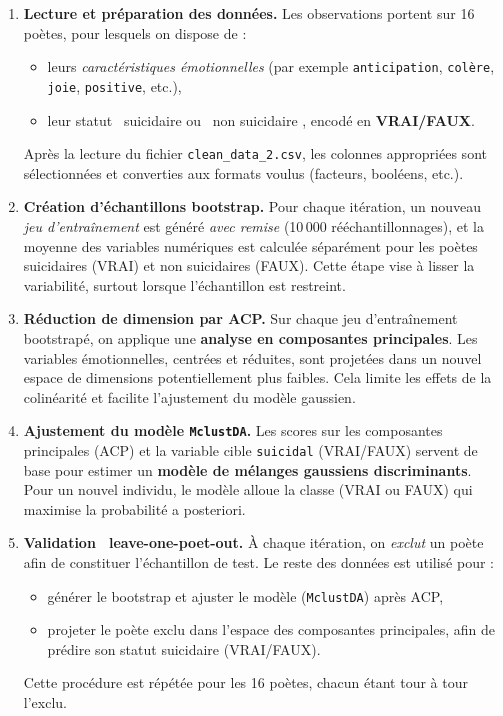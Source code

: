 \begin{enumerate}
	\item \textbf{Lecture et préparation des données.}  
	Les observations portent sur 16 poètes, pour lesquels on dispose de :
	\begin{itemize}
		\item leurs \emph{caractéristiques émotionnelles} (par exemple \texttt{anticipation}, \texttt{colère}, \texttt{joie}, \texttt{positive}, etc.), 
		\item leur statut \og\, suicidaire \fg{} ou \og\, non suicidaire \fg, encodé en \textbf{VRAI/FAUX}.
	\end{itemize}
	Après la lecture du fichier \texttt{clean\_data\_2.csv}, les colonnes appropriées sont sélectionnées et converties aux formats voulus (facteurs, booléens, etc.).
	
	\item \textbf{Création d’échantillons bootstrap.}  
	Pour chaque itération, un nouveau \emph{jeu d’entraînement} est généré \emph{avec remise} (10\,000 rééchantillonnages), et la moyenne des variables numériques est calculée séparément pour les poètes suicidaires (VRAI) et non suicidaires (FAUX). Cette étape vise à lisser la variabilité, surtout lorsque l’échantillon est restreint.
	
	\item \textbf{Réduction de dimension par ACP.}  
	Sur chaque jeu d’entraînement bootstrapé, on applique une \textbf{analyse en composantes principales}. Les variables émotionnelles, centrées et réduites, sont projetées dans un nouvel espace de dimensions potentiellement plus faibles. Cela limite les effets de la colinéarité et facilite l’ajustement du modèle gaussien.
	
	\item \textbf{Ajustement du modèle \texttt{MclustDA}.}  
	Les scores sur les composantes principales (ACP) et la variable cible \texttt{suicidal} (VRAI/FAUX) servent de base pour estimer un \textbf{modèle de mélanges gaussiens discriminants}. Pour un nouvel individu, le modèle alloue la classe (VRAI ou FAUX) qui maximise la probabilité a posteriori.
	
	\item \textbf{Validation \og\, leave-one-poet-out\fg.}  
	À chaque itération, on \emph{exclut} un poète afin de constituer l’échantillon de test. Le reste des données est utilisé pour :
	\begin{itemize}
		\item générer le bootstrap et ajuster le modèle (\texttt{MclustDA}) après ACP,
		\item projeter le poète exclu dans l’espace des composantes principales, afin de prédire son statut suicidaire (VRAI/FAUX).
	\end{itemize}
	Cette procédure est répétée pour les 16 poètes, chacun étant tour à tour l’exclu.
	
\end{enumerate}

